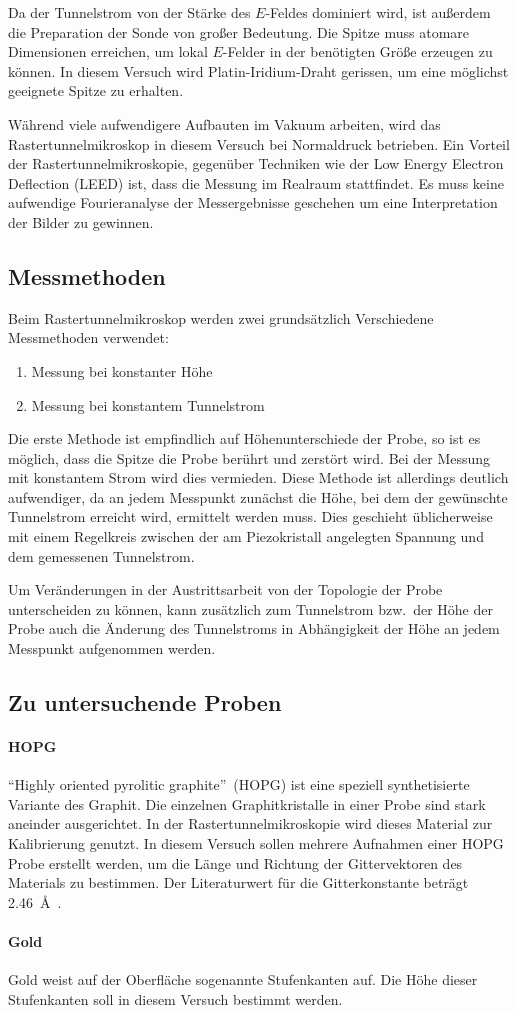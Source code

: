 Da der Tunnelstrom von der Stärke des $E$-Feldes dominiert wird,
ist außerdem die Preparation der Sonde von großer Bedeutung.
Die Spitze muss atomare Dimensionen erreichen, um lokal $E$-Felder in der benötigten Größe erzeugen zu können.
In diesem Versuch wird Platin-Iridium-Draht gerissen, um eine möglichst geeignete Spitze zu erhalten.

Während viele aufwendigere Aufbauten im Vakuum arbeiten, wird das Rastertunnelmikroskop in diesem Versuch bei Normaldruck betrieben.
Ein Vorteil der Rastertunnelmikroskopie, gegenüber Techniken wie der Low Energy Electron Deflection (LEED) ist, dass die Messung im Realraum stattfindet.
Es muss keine aufwendige Fourieranalyse der Messergebnisse geschehen um eine Interpretation der Bilder zu gewinnen.


\subsection{Messmethoden}

Beim Rastertunnelmikroskop werden zwei grundsätzlich Verschiedene Messmethoden verwendet:
\begin{enumerate}
  \item Messung bei konstanter Höhe
  \item Messung bei konstantem Tunnelstrom
\end{enumerate}

Die erste Methode ist empfindlich auf Höhenunterschiede der Probe, so ist es möglich, dass die Spitze die Probe berührt und zerstört wird.
Bei der Messung mit konstantem Strom wird dies vermieden.
Diese Methode ist allerdings deutlich aufwendiger, da an jedem Messpunkt zunächst die Höhe, bei dem der gewünschte Tunnelstrom erreicht wird, ermittelt werden muss.
Dies geschieht üblicherweise mit einem Regelkreis zwischen der am Piezokristall angelegten Spannung und dem gemessenen Tunnelstrom.

Um Veränderungen in der Austrittsarbeit von der Topologie der Probe unterscheiden zu können, kann zusätzlich zum Tunnelstrom bzw.\ der Höhe der Probe auch die Änderung des Tunnelstroms in Abhängigkeit der Höhe an jedem Messpunkt aufgenommen werden.

\subsection{Zu untersuchende Proben}

\paragraph{HOPG}
\enquote{Highly oriented pyrolitic graphite}~(HOPG) ist eine speziell synthetisierte Variante des Graphit.
Die einzelnen Graphitkristalle in einer Probe sind stark aneinder ausgerichtet.
In der Rastertunnelmikroskopie wird dieses Material zur Kalibrierung genutzt.
In diesem Versuch sollen mehrere Aufnahmen einer HOPG Probe erstellt werden,
um die Länge und Richtung der Gittervektoren des Materials zu bestimmen.
Der Literaturwert für die Gitterkonstante beträgt \SI{2.46}{\angstrom}~\cite{stm1}.

\paragraph{Gold}
Gold weist auf der Oberfläche sogenannte Stufenkanten auf. Die Höhe dieser Stufenkanten soll in diesem Versuch bestimmt werden.

